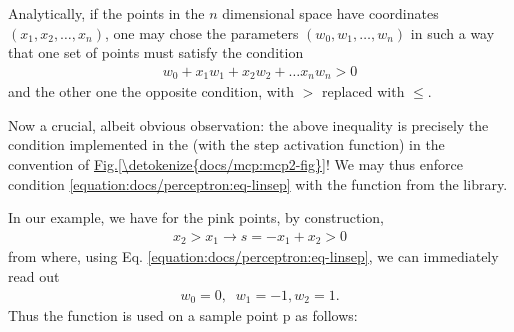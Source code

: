 \documentclass[letterpaper,10pt,english]{jupyterBook}
\begin{document}
\sphinxAtStartPar
Analytically, if the points in the \(n\) dimensional space have coordinates \((x_1,x_2,\dots,x_n)\), one may chose the parameters \((w_0,w_1,\dots,w_n)\) in such a way that one set of points must satisfy the condition
\begin{equation}\label{equation:docs/perceptron:eq-linsep}
\begin{split}w_0+x_1 w_1+x_2 w_2 + \dots x_n w_n > 0\end{split}
\end{equation}
\sphinxAtStartPar
and the other one the opposite condition, with \(>\) replaced with \(\le\).

\sphinxAtStartPar
Now a crucial, albeit obvious observation: the above inequality is precisely the condition implemented in the {\hyperref[\detokenize{docs/mcp:mcp-lab}]{}} (with the step activation function) in the convention of \hyperref[\detokenize{docs/mcp:mcp2-fig}]{Fig.\@ \ref{\detokenize{docs/mcp:mcp2-fig}}}! We may thus enforce condition \eqref{equation:docs/perceptron:eq-linsep} with the  function from the  library.

\sphinxAtStartPar
In our example, we have for the pink points, by construction,
\begin{equation*}
\begin{split}
x_2>x_1 \to s=-x_1+x_2 >0
\end{split}
\end{equation*}
\sphinxAtStartPar
from where, using  Eq. \eqref{equation:docs/perceptron:eq-linsep}, we can immediately read out
\begin{equation*}
\begin{split}
w_0=0, \;\; w_1=-1, w_2=1.
\end{split}
\end{equation*}
\sphinxAtStartPar
Thus the  function is used on a sample point p as follows:

\begin{sphinxVerbatim}[commandchars=\\\{\}]
\PYG{p}{[}\PYG{p}{]}      
\PYG{p}{[}\PYG{p}{]}       

\end{sphinxVerbatim}
\end{document}
